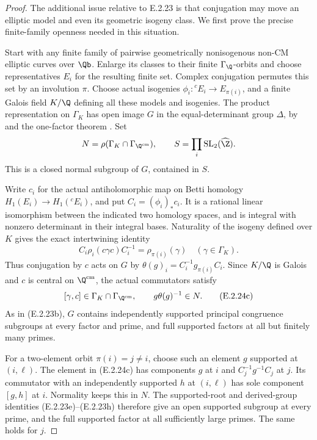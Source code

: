 \begin{proof}
The additional issue relative to E.2.23 is that conjugation
may move an elliptic model and even its geometric isogeny
class. We first prove the precise finite-family openness
needed in this situation.

Start with any finite family of pairwise geometrically
nonisogenous non-CM elliptic curves over \(\Qb\).
Enlarge its classes to their finite \(\Gamma_\Q\)-orbits
and choose representatives \(E_i\) for the resulting finite
set. Complex conjugation permutes this set by an involution
\(\pi\). Choose actual isogenies
\(\phi_i:{}^cE_i\to E_{\pi(i)}\), and a finite Galois
field \(K/\Q\) defining all these models and isogenies.
The product representation on \(\Gamma_K\) has open image
\(G\) in the equal-determinant group \(\Delta\), by
\cite[Theorem 1.1, author PDF p.1]{GenLombardo} and the
one-factor theorem \cite[Theorem 3, p.299]{GenSerre1972}.
Set
\[
 N=\rho(\Gamma_K\cap\Gamma_{\Q^{\mathrm{cm}}}),
 \qquad S=\prod_i\operatorname{SL}_2(\widehat\Z).
\]
This is a closed normal subgroup of \(G\), contained in \(S\).

Write \(c_i\) for the actual antiholomorphic map on Betti
homology \(H_1(E_i)\to H_1({}^cE_i)\), and put
\(C_i=(\phi_i)_*c_i\). It is a rational linear isomorphism
between the indicated two homology spaces, and is integral
with nonzero determinant in their integral bases.
Naturality of the isogeny defined over \(K\) gives the exact
intertwining identity
\[
 C_i\rho_i(c\gamma c)C_i^{-1}
                 =\rho_{\pi(i)}(\gamma)
                       \quad(\gamma\in\Gamma_K).
 \tag{E.2.24b}
\]
Thus conjugation by \(c\) acts on \(G\) by
\(\theta(g)_i=C_i^{-1}g_{\pi(i)}C_i\).
Since \(K/\Q\) is Galois and \(c\) is central on
\(\Q^{\mathrm{cm}}\), the actual commutators satisfy
\[
 [\gamma,c]\in\Gamma_K\cap\Gamma_{\Q^{\mathrm{cm}}},
 \qquad g\theta(g)^{-1}\in N.
 \tag{E.2.24c}
\]
As in (E.2.23b), \(G\) contains independently supported
principal congruence subgroups at every factor and prime,
and full supported factors at all but finitely many primes.

For a two-element orbit \(\pi(i)=j\ne i\), choose such
an element \(g\) supported at \((i,\ell)\).
The element in (E.2.24c) has components \(g\) at \(i\)
and \(C_j^{-1}g^{-1}C_j\) at \(j\).
Its commutator with an independently supported \(h\) at
\((i,\ell)\) has sole component \([g,h]\) at \(i\).
Normality keeps this in \(N\). The supported-root and
derived-group identities (E.2.23e)--(E.2.23h) therefore
give an open supported subgroup at every prime, and the
full supported factor at all sufficiently large primes.
The same holds for \(j\).


\end{proof}
